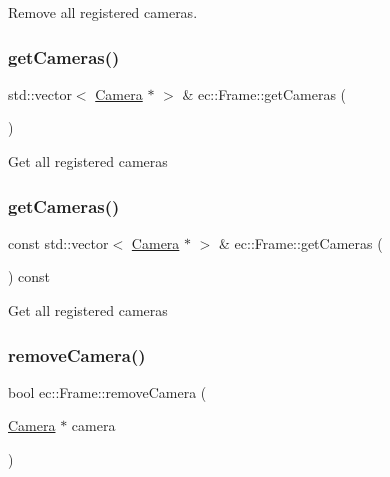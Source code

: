 Remove all registered cameras. \mbox{\label{classec_1_1_frame_a942b4c8826f6169703ff6b19ae60be8c}} 
\subsubsection{\texorpdfstring{get\+Cameras()}{getCameras()}\hspace{0.1cm}{\footnotesize\ttfamily [1/2]}}
{\footnotesize\ttfamily std\+::vector$<$ \mbox{\hyperlink{classec_1_1_camera}{Camera}} $\ast$ $>$ \& ec\+::\+Frame\+::get\+Cameras (\begin{DoxyParamCaption}{ }\end{DoxyParamCaption})}

Get all registered cameras \mbox{\label{classec_1_1_frame_a80aefbcba8339fabc3b4aa2b8b21a8bf}} 
\subsubsection{\texorpdfstring{get\+Cameras()}{getCameras()}\hspace{0.1cm}{\footnotesize\ttfamily [2/2]}}
{\footnotesize\ttfamily const std\+::vector$<$ \mbox{\hyperlink{classec_1_1_camera}{Camera}} $\ast$ $>$ \& ec\+::\+Frame\+::get\+Cameras (\begin{DoxyParamCaption}{ }\end{DoxyParamCaption}) const}

Get all registered cameras \mbox{\label{classec_1_1_frame_a7a93ec89a809f5b7e685c5adc73d6cda}} 
\subsubsection{\texorpdfstring{remove\+Camera()}{removeCamera()}}
{\footnotesize\ttfamily bool ec\+::\+Frame\+::remove\+Camera (\begin{DoxyParamCaption}\item[{\mbox{\hyperlink{classec_1_1_camera}{Camera}} $\ast$}]{camera }\end{DoxyParamCaption})}

